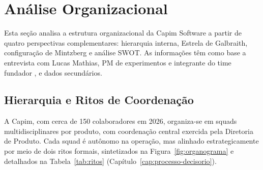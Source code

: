 
\chapter{Análise Organizacional}
\label{cap:analise-organizacional}

Esta seção analisa a estrutura organizacional da Capim Software a partir de quatro perspectivas complementares: hierarquia interna, Estrela de Galbraith, configuração de Mintzberg e análise SWOT. As informações têm como base a entrevista com Lucas Mathias, PM de experimentos e integrante do time fundador \cite{capimentrevista2026}, e dados secundários.

\section{Hierarquia e Ritos de Coordenação}

A Capim, com cerca de 150 colaboradores em 2026, organiza-se em squads multidisciplinares por produto, com coordenação central exercida pela Diretoria de Produto. Cada squad é autônomo na operação, mas alinhado estrategicamente por meio de dois ritos formais, sintetizados na Figura~\ref{fig:organograma} e detalhados na Tabela~\ref{tab:ritos} (Capítulo~\ref{cap:processo-decisorio}).

